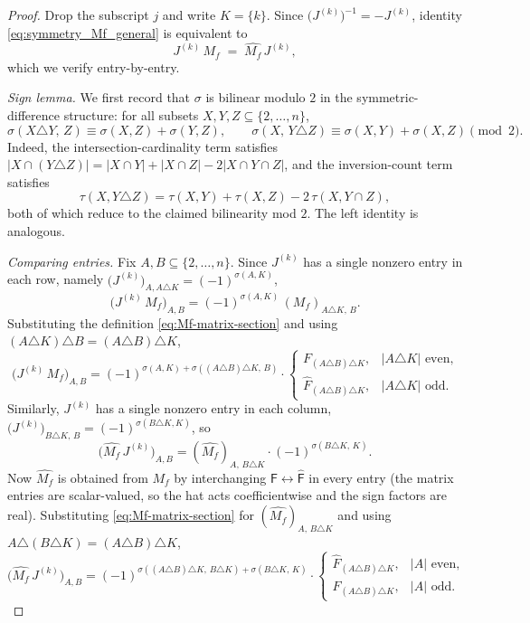 \documentclass[11pt]{amsart}
\begin{document}
\begin{proof}
Drop the subscript $j$ and write $K=\{k\}$. Since $\bigl(J^{(k)}\bigr)^{-1}=-J^{(k)}$, identity \eqref{eq:symmetry_Mf_general} is equivalent to
\begin{equation}\label{eq:symmetry_Mf_equiv}
J^{(k)}\,M_f \;=\; \widehat{M_f}\,J^{(k)},
\end{equation}
which we verify entry-by-entry.

\smallskip\noindent\emph{Sign lemma.}\;
We first record that $\sigma$ is bilinear modulo $2$ in the symmetric-difference structure: for all subsets $X,Y,Z\subseteq\{2,\ldots,n\}$,
\begin{equation}\label{eq:sigma-bilinear}
\sigma(X\triangle Y,\,Z)\equiv \sigma(X,Z)+\sigma(Y,Z),\qquad
\sigma(X,\,Y\triangle Z)\equiv \sigma(X,Y)+\sigma(X,Z)\pmod 2.
\end{equation}
Indeed, the intersection-cardinality term satisfies $|X\cap(Y\triangle Z)|=|X\cap Y|+|X\cap Z|-2|X\cap Y\cap Z|$, and the inversion-count term satisfies
\[
\tau(X,Y\triangle Z)=\tau(X,Y)+\tau(X,Z)-2\,\tau(X,Y\cap Z),
\]
both of which reduce to the claimed bilinearity mod $2$. The left identity is analogous.

\smallskip\noindent\emph{Comparing entries.}\;
Fix $A,B\subseteq\{2,\ldots,n\}$. Since $J^{(k)}$ has a single nonzero entry in each row, namely $\bigl(J^{(k)}\bigr)_{A,A\triangle K}=(-1)^{\sigma(A,K)}$,
\[
\bigl(J^{(k)}\,M_f\bigr)_{A,B}
=(-1)^{\sigma(A,K)}\,(M_f)_{A\triangle K,\,B}.
\]
Substituting the definition \eqref{eq:Mf-matrix-section} and using $(A\triangle K)\triangle B=(A\triangle B)\triangle K$,
\begin{equation}\label{eq:LHS-entry}
\bigl(J^{(k)}\,M_f\bigr)_{A,B}
=(-1)^{\sigma(A,K)+\sigma((A\triangle B)\triangle K,\,B)}\cdot
\begin{cases}
F_{(A\triangle B)\triangle K}, & |A\triangle K|\text{ even,}\\
\hat F_{(A\triangle B)\triangle K}, & |A\triangle K|\text{ odd.}
\end{cases}
\end{equation}
Similarly, $J^{(k)}$ has a single nonzero entry in each column, $\bigl(J^{(k)}\bigr)_{B\triangle K,\,B}=(-1)^{\sigma(B\triangle K,K)}$, so
\[
\bigl(\widehat{M_f}\,J^{(k)}\bigr)_{A,B}
=(\widehat{M_f})_{A,\,B\triangle K}\cdot(-1)^{\sigma(B\triangle K,\,K)}.
\]
Now $\widehat{M_f}$ is obtained from $M_f$ by interchanging $\mathsf{F}\leftrightarrow\hat{\mathsf{F}}$ in every entry (the matrix entries are scalar-valued, so the hat acts coefficientwise and the sign factors are real). Substituting \eqref{eq:Mf-matrix-section} for $(\widehat{M_f})_{A,\,B\triangle K}$ and using $A\triangle(B\triangle K)=(A\triangle B)\triangle K$,
\begin{equation}\label{eq:RHS-entry}
\bigl(\widehat{M_f}\,J^{(k)}\bigr)_{A,B}
=(-1)^{\sigma((A\triangle B)\triangle K,\,B\triangle K)+\sigma(B\triangle K,\,K)}\cdot
\begin{cases}
\hat{F}_{(A\triangle B)\triangle K}, & |A|\text{ even,}\\
F_{(A\triangle B)\triangle K}, & |A|\text{ odd.}
\end{cases}
\end{equation}


\end{proof}
\end{document}
